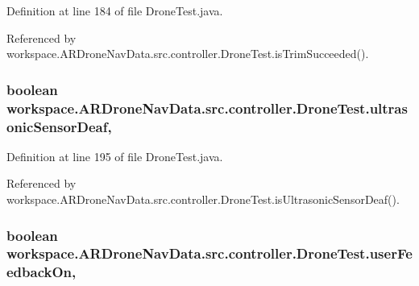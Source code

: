 Definition at line 184 of file Drone\+Test.\+java.



Referenced by workspace.\+A\+R\+Drone\+Nav\+Data.\+src.\+controller.\+Drone\+Test.\+is\+Trim\+Succeeded().

\hypertarget{classworkspace_1_1_a_r_drone_nav_data_1_1src_1_1controller_1_1_drone_test_a402465258f31b68d7bae7c915ac7f022}{}
\subsubsection[{ultrasonic\+Sensor\+Deaf}]{\setlength{\rightskip}{0pt plus 5cm}boolean workspace.\+A\+R\+Drone\+Nav\+Data.\+src.\+controller.\+Drone\+Test.\+ultrasonic\+Sensor\+Deaf\hspace{0.3cm}{\ttfamily [static]}, {\ttfamily [protected]}}\label{classworkspace_1_1_a_r_drone_nav_data_1_1src_1_1controller_1_1_drone_test_a402465258f31b68d7bae7c915ac7f022}


Definition at line 195 of file Drone\+Test.\+java.



Referenced by workspace.\+A\+R\+Drone\+Nav\+Data.\+src.\+controller.\+Drone\+Test.\+is\+Ultrasonic\+Sensor\+Deaf().

\hypertarget{classworkspace_1_1_a_r_drone_nav_data_1_1src_1_1controller_1_1_drone_test_a6e19c9fdd46bb86c96abddcebc92f353}{}
\subsubsection[{user\+Feedback\+On}]{\setlength{\rightskip}{0pt plus 5cm}boolean workspace.\+A\+R\+Drone\+Nav\+Data.\+src.\+controller.\+Drone\+Test.\+user\+Feedback\+On\hspace{0.3cm}{\ttfamily [static]}, {\ttfamily [protected]}}\label{classworkspace_1_1_a_r_drone_nav_data_1_1src_1_1controller_1_1_drone_test_a6e19c9fdd46bb86c96abddcebc92f353}


